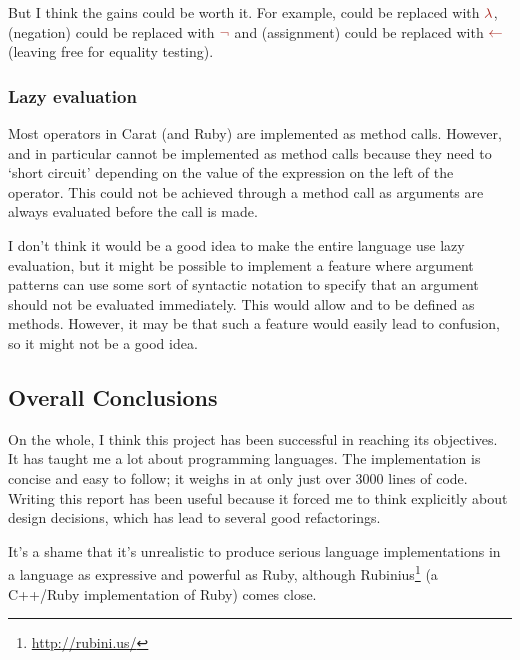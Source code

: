But I think the gains could be worth it. For example,  could be replaced with $\color{Mahogany} \lambda$, \code{!} (negation) could be replaced with $\color{Mahogany} \neg$ and \code{=} (assignment) could be replaced with $\color{Mahogany} \leftarrow$ (leaving \code{=} free for equality testing).

\subsubsection{Lazy evaluation}

Most operators in Carat (and Ruby) are implemented as method calls. However, \code{&&} and \code{||} in particular cannot be implemented as method calls because they need to `short circuit' depending on the value of the expression on the left of the operator. This could not be achieved through a method call as arguments are always evaluated before the call is made.

I don't think it would be a good idea to make the entire language use lazy evaluation, but it might be possible to implement a feature where argument patterns can use some sort of syntactic notation to specify that an argument should not be evaluated immediately. This would allow \code{&&} and \code{||} to be defined as methods. However, it may be that such a feature would easily lead to confusion, so it might not be a good idea.

\subsection{Overall Conclusions}

On the whole, I think this project has been successful in reaching its objectives. It has taught me a lot about programming languages. The implementation is concise and easy to follow; it weighs in at only just over 3000 lines of code. Writing this report has been useful because it forced me to think explicitly about design decisions, which has lead to several good refactorings.

It's a shame that it's unrealistic to produce serious language implementations in a language as expressive and powerful as Ruby, although Rubinius\footnote{\url{http://rubini.us/}} (a C++/Ruby implementation of Ruby) comes close.
